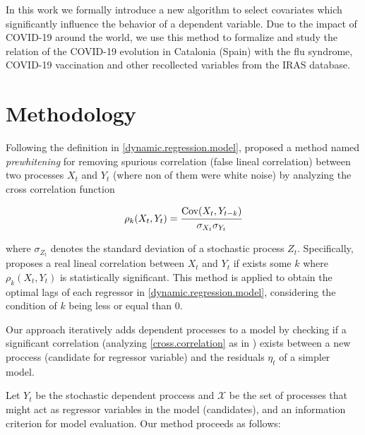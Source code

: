 \documentclass[a4paper]{easychair}
\begin{document}


In this work we formally introduce a new algorithm to select covariates which significantly influence the behavior of a dependent variable. Due to the impact of COVID-19 around the world, we use this method to formalize and study the relation of the COVID-19 evolution in Catalonia (Spain) with the flu syndrome, COVID-19 vaccination and other recollected variables from the IRAS database.

\section{Methodology}

Following the definition in \ref{dynamic.regression.model}, \cite{cryer2008time} proposed a method named \textit{prewhitening} for removing spurious correlation (false lineal correlation) between two processes $X_t$ and $Y_t$ (where non of them were white noise) by analyzing the cross correlation function 

\begin{equation}\label{cross.correlation}
\rho_k(X_t, Y_t) =  \cfrac{\text{Cov}(X_t, Y_{t-k})}{\sigma_{X_t} \sigma_{Y_t}}
\end{equation}

where $\sigma_{Z_t}$ denotes the standard deviation of a stochastic process $Z_t$. Specifically, \cite{cryer2008time} proposes a real lineal correlation between $X_t$ and $Y_t$ if exists some $k$ where $\rho_k(X_t, Y_t)$ is statistically significant. This method is applied to obtain the optimal lags of each regressor in \ref{dynamic.regression.model}, considering the condition of $k$ being less or equal than $0$.

Our approach iteratively adds dependent processes to a model by checking if a significant correlation (analyzing \ref{cross.correlation} as in \cite{cryer2008time}) exists between a new proccess (candidate for regressor variable) and the residuals $\eta_t$ of a simpler model.

Let $Y_t$ be the stochastic dependent proccess and $\mathcal{X}$ be the set of processes that might act as regressor variables in the model (candidates), and an information criterion for model evaluation. Our method proceeds as follows:
\end{document}
